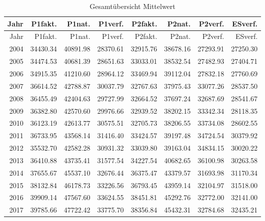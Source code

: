 \documentclass[12pt,]{article}
\begin{document}
\begin{longtable}[]{@{}rrrrrrrr@{}}
\caption{Gesamtübersicht Mittelwert}\tabularnewline
\toprule
Jahr & P1fakt. & P1nat. & P1verf. & P2fakt. & P2nat. & P2verf. &
ESverf.\tabularnewline
\midrule
\endfirsthead
\toprule
Jahr & P1fakt. & P1nat. & P1verf. & P2fakt. & P2nat. & P2verf. &
ESverf.\tabularnewline
\midrule
\endhead
2004 & 34430.34 & 40891.98 & 28370.61 & 32915.76 & 38678.16 & 27293.91 &
27250.30\tabularnewline
2005 & 34474.53 & 40681.39 & 28651.63 & 33033.01 & 38532.54 & 27482.93 &
27404.71\tabularnewline
2006 & 34915.35 & 41210.60 & 28964.12 & 33469.94 & 39112.04 & 27832.18 &
27760.69\tabularnewline
2007 & 36614.52 & 42788.87 & 30037.79 & 32767.63 & 37975.43 & 33077.26 &
28537.50\tabularnewline
2008 & 36455.49 & 42404.63 & 29727.99 & 32664.52 & 37697.24 & 32687.69 &
28541.67\tabularnewline
2009 & 36382.80 & 42570.60 & 29976.66 & 32939.52 & 38202.15 & 33342.34 &
28118.35\tabularnewline
2010 & 36123.19 & 42613.77 & 30575.51 & 32705.73 & 38206.55 & 33734.08 &
28602.55\tabularnewline
2011 & 36733.95 & 43568.14 & 31416.40 & 33424.57 & 39197.48 & 34724.54 &
30379.92\tabularnewline
2012 & 35532.70 & 42582.28 & 30931.32 & 33039.80 & 39163.04 & 34834.15 &
30020.22\tabularnewline
2013 & 36410.88 & 43735.41 & 31577.54 & 34227.54 & 40682.65 & 36100.98 &
30263.58\tabularnewline
2014 & 37655.67 & 45537.10 & 32676.44 & 36375.47 & 43379.57 & 31693.98 &
31170.34\tabularnewline
2015 & 38132.84 & 46178.73 & 33226.56 & 36793.45 & 43959.14 & 32104.97 &
31518.00\tabularnewline
2016 & 39909.14 & 47567.60 & 33624.55 & 38451.81 & 45292.76 & 32772.00 &
32141.00\tabularnewline
2017 & 39785.66 & 47722.42 & 33775.70 & 38356.84 & 45432.31 & 32784.68 &
32435.21\tabularnewline
\bottomrule
\end{longtable}
\end{document}
